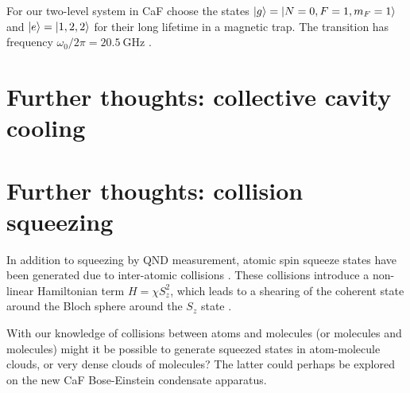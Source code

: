 \documentclass{article}
\begin{document}
For our two-level
system in CaF choose the states $\ket{g} = \ket{N=0, F=1, m_F=1}$ and $\ket{e}
= \ket{1, 2, 2}$ for their long lifetime in a magnetic trap. The transition has
frequency $\omega_0/2\pi = \SI{20.5}{\giga\hertz}$ \cite{Williams2018}.

\section{Further thoughts: collective cavity cooling}


\section{Further thoughts: collision squeezing}

In addition to squeezing by QND measurement, atomic spin squeeze states have
been generated due to inter-atomic collisions \cite{}. These collisions
introduce a non-linear Hamiltonian term $H=\chi S_z^2$, which leads to a
shearing of the coherent state around the Bloch sphere around the $S_z$ state
\cite{}.

With our knowledge of collisions between atoms and molecules (or molecules and
molecules) might it be possible to generate squeezed states in atom-molecule
clouds, or very dense clouds of molecules? The latter could perhaps be explored
on the new CaF Bose-Einstein condensate apparatus.
\end{document}
